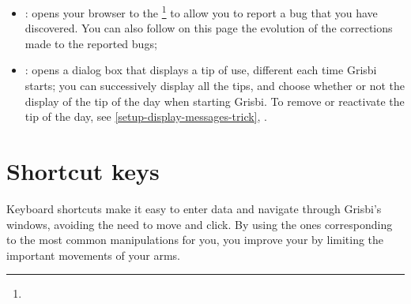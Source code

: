 \footnotetext{\urlGrisbi{}}	%
\begin{itemize}
	\item {}: opens your browser to the \footnote{\urlBugTracker{}} to allow you to report a bug that you have discovered. You can also follow on this page the evolution of the corrections made to the reported bugs;
	\item {}: opens a dialog box that displays a tip of use, different each time Grisbi starts; you can successively display all the tips, and choose whether or not the display of the tip of the day when starting Grisbi. To remove or reactivate the tip of the day, see \vref{setup-display-messages-trick}, .
\end{itemize}


\section{Shortcut keys\label{home-shortcuts}}


Keyboard shortcuts make it easy to enter data and navigate through Grisbi's windows, avoiding the need to move and click. By using the ones corresponding to the most common manipulations for you, you improve your  by limiting the important movements of your arms.

